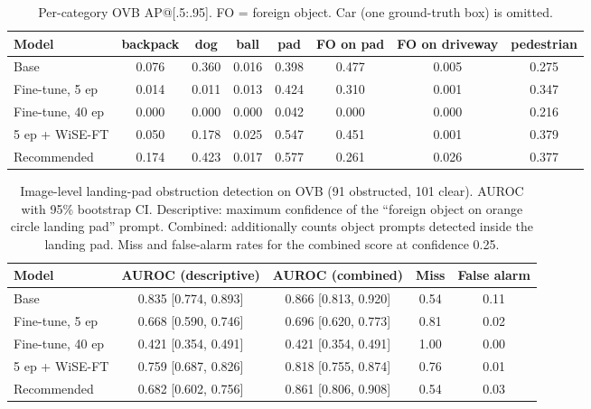 \documentclass[conf]{new-aiaa}
\begin{document}
\begin{table}[hbt!]
\caption{Per-category OVB AP@[.5:.95]. FO = foreign object. Car (one ground-truth box) is omitted.}
\label{tab:perclassovb}
\centering
\begin{tabular}{lccccccc}
\hline
\textbf{Model} & \textbf{backpack} & \textbf{dog} & \textbf{ball} & \textbf{pad} & \textbf{FO on pad} & \textbf{FO on driveway} & \textbf{pedestrian} \\
\hline
Base             & 0.076 & 0.360 & 0.016 & 0.398 & 0.477 & 0.005 & 0.275 \\
Fine-tune, 5 ep  & 0.014 & 0.011 & 0.013 & 0.424 & 0.310 & 0.001 & 0.347 \\
Fine-tune, 40 ep & 0.000 & 0.000 & 0.000 & 0.042 & 0.000 & 0.000 & 0.216 \\
5 ep + WiSE-FT   & 0.050 & 0.178 & 0.025 & 0.547 & 0.451 & 0.001 & 0.379 \\
Recommended      & 0.174 & 0.423 & 0.017 & 0.577 & 0.261 & 0.026 & 0.377 \\
\hline
\end{tabular}
\end{table}

\begin{table}[hbt!]
\caption{Image-level landing-pad obstruction detection on OVB (91 obstructed, 101 clear).
         AUROC with 95\% bootstrap CI. Descriptive: maximum confidence of the ``foreign object
         on orange circle landing pad'' prompt. Combined: additionally counts object prompts
         detected inside the landing pad. Miss and false-alarm rates for the combined score at
         confidence 0.25.}
\label{tab:obstruction}
\centering
\begin{tabular}{lcccc}
\hline
\textbf{Model} & \textbf{AUROC (descriptive)} & \textbf{AUROC (combined)} & \textbf{Miss} & \textbf{False alarm} \\
\hline
Base             & 0.835 [0.774, 0.893] & 0.866 [0.813, 0.920] & 0.54 & 0.11 \\
Fine-tune, 5 ep  & 0.668 [0.590, 0.746] & 0.696 [0.620, 0.773] & 0.81 & 0.02 \\
Fine-tune, 40 ep & 0.421 [0.354, 0.491] & 0.421 [0.354, 0.491] & 1.00 & 0.00 \\
5 ep + WiSE-FT   & 0.759 [0.687, 0.826] & 0.818 [0.755, 0.874] & 0.76 & 0.01 \\
Recommended      & 0.682 [0.602, 0.756] & 0.861 [0.806, 0.908] & 0.54 & 0.03 \\
\hline
\end{tabular}
\end{table}
\end{document}
